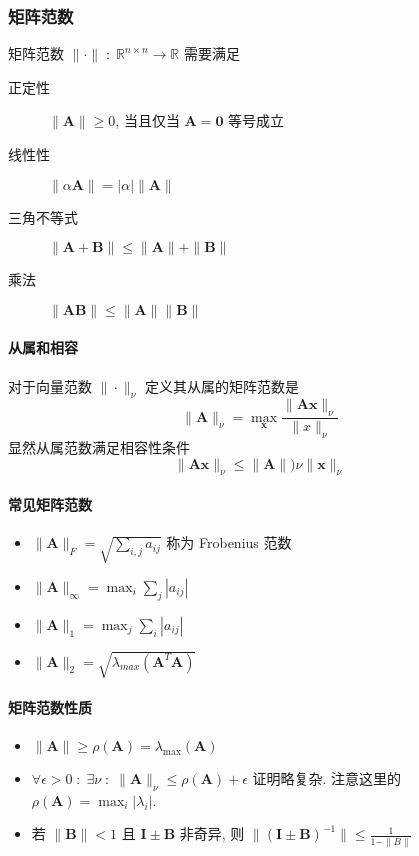 \documentclass{ctexart}
\newcommand{\Rset}{\mathbb{R}}
\begin{document}
\subsubsection{矩阵范数}
    矩阵范数 $\|\cdot\|\;:\;\Rset^{n \times n}\to \Rset$ 需要满足
    \begin{description}
        \item[正定性] $\| \mathbf{A} \| \ge 0$, 当且仅当 $\mathbf{A} = \mathbf{0}$ 等号成立
        \item[线性性] $\|\alpha \mathbf{A}\| = |\alpha| \|\mathbf{A}\|$
        \item [三角不等式] $\|\mathbf{A} + \mathbf{B}\| \le \|\mathbf{A}\| + \|\mathbf{B}\|$
        \item[乘法] $\|\mathbf{A} \mathbf{B} \| \le \|\mathbf{A} \| \|\mathbf{B}\|$
    \end{description}
\paragraph{从属和相容}
    对于向量范数 $\|\cdot\|_{\nu}$ 定义其从属的矩阵范数是 \[
        \|\mathbf{A}\|_{\nu} = \max_{\mathbf{x}} \frac{\|\mathbf{A} \mathbf{x} \|_{\nu}}{\|x\|_{\nu}}
        \]
    显然从属范数满足相容性条件 \[
        \| \mathbf{A} \mathbf{x} \|_{\nu} \le \|\mathbf{A}\|){\nu} \|\mathbf{x}\|_{\nu}\]
\paragraph{常见矩阵范数}
    \begin{itemize}
        \item $\|\mathbf{A}\|_F = \sqrt{\sum_{i,j} a_{ij}}$ 称为 Frobenius 范数
        \item $\|\mathbf{A}\|_{\infty} = \max_i \sum_j |a_{ij}|$
        \item $\|\mathbf{A}\|_1 = \max_j \sum_i |a_{ij}|$
        \item $\|\mathbf{A}\|_2 = \sqrt{\lambda_{max}(\mathbf{A}^T \mathbf{A})}$
    \end{itemize}
\paragraph{矩阵范数性质}
    \begin{itemize}
        \item $\|\mathbf{A} \| \ge \rho(\mathbf{A} ) = \lambda_{\max}(\mathbf{A} )$
        \item $\forall \epsilon > 0\;:\;\exists \nu\;:\;\|\mathbf{A}\|_{\nu} \le \rho(\mathbf{A}) + \epsilon$
            证明略复杂. 注意这里的 $\rho(\mathbf{A}) = \max_i |\lambda_i|$.
        \item 若 $\|\mathbf{B} \| < 1$ 且 $\mathbf{I} \pm \mathbf{B} $ 非奇异, 则
            $ \| (\mathbf{I} \pm \mathbf{B})^{-1} \| \le \frac{1}{1 - \|B\|}$
    \end{itemize}
\end{document}
